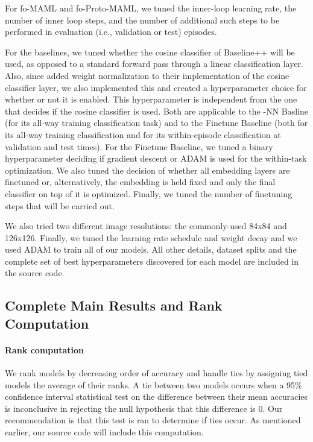 \documentclass{article} \usepackage{iclr2020_conference,times}
\begin{document}
For fo-MAML and fo-Proto-MAML, we tuned the inner-loop learning rate, the
number of inner loop steps, and the number of additional such steps to be
performed in evaluation (i.e., validation or test) episodes.

For the baselines, we tuned whether the cosine classifier of Baseline++ will be
used, as opposed to a standard forward pass through a linear classification
layer. Also, since \citet{chen2019closer} added weight normalization
\citep{salimans2016weight} to their implementation of the cosine classifier
layer, we also implemented this and created a hyperparameter choice for whether
or not it is enabled. This hyperparameter is independent from the one that
decides if the cosine classifier is used. Both are applicable to the -NN
Basline (for its all-way training classification task) and to the Finetune
Baseline (both for its all-way training classification and for its
within-episode classification at validation and test times). For the Finetune
Baseline, we tuned a binary hyperparameter deciding if gradient descent or ADAM
is used for the within-task optimization. We also tuned the decision of whether
all embedding layers are finetuned or, alternatively, the embedding is held
fixed and only the final classifier on top of it is optimized. Finally, we tuned
the number of finetuning steps that will be carried out.

We also tried two different image resolutions: the commonly-used 84x84 and 126x126. Finally, we tuned the learning rate schedule and weight decay and we used ADAM to train all of our models. All other details, dataset splits and the complete set of best hyperparameters discovered for each model are included in the source code.

\subsection{Complete Main Results and Rank Computation}

\paragraph{Rank computation}
We rank models by decreasing order of accuracy and handle
ties by assigning tied models the average of their ranks. A tie between two
models occurs when a 95\% confidence interval statistical test on the
difference between their mean accuracies is inconclusive in rejecting the null
hypothesis that this difference is 0.
Our recommendation is that this test is ran to determine if ties occur.
As mentioned earlier, our source code will include this computation.
\end{document}
